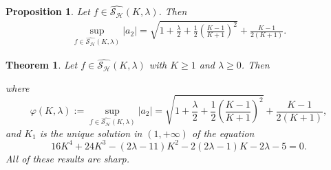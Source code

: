\documentclass[10pt,a4paper]{amsart}
\newtheorem{prop}{Proposition}
\newtheorem{theorem}{Theorem}
\newcommand{\abs}[1]{\left\vert#1\right\vert}
\begin{document}
\begin{prop} \label{c1}
Let $f\in\widehat{\mathcal{S}_\mathcal{H}}(K,\lambda)$. %
Then
\begin{align*}
\sup\limits_{f\in\widehat{\mathcal{S}_\mathcal{H}}(K,\lambda)}\abs{a_2}=\sqrt{1+\frac{\lambda}{2}+\frac{1}{2}\left(\frac{K-1}{K+1}\right)^2}+\frac{K-1}{2\left({K+1}\right)}. 
\end{align*}
\end{prop}

\begin{theorem}\label{t1}
Let $f\in\widehat{\mathcal{S}_\mathcal{H}}(K,\lambda)$ with $K\geq1$ and $\lambda\geq0$. %
Then
where
\begin{equation}\label{1}\varphi(K,\lambda):=\sup\limits_{f\in\widehat{\mathcal{S}_\mathcal{H}}(K,\lambda)}\abs{a_2}
=\sqrt{1+\frac{\lambda}{2}+\frac{1}{2}\left(\frac{K-1}{K+1}\right)^2}+\frac{K-1}{2\left({K+1}\right)},\end{equation}
and 
$K_1$ is the unique solution in $(1,+\infty)$ of the equation
\begin{equation}\label{2}16K^4+24K^3-(2\lambda-11)K^2-2(2\lambda-1)K-2\lambda-5=0.\end{equation}
All of these results are sharp.
\end{theorem}
\end{document}
